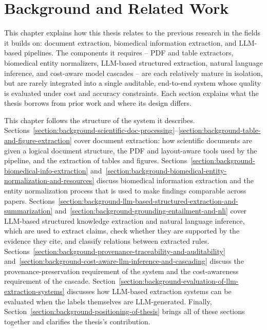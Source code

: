 
\chapter{Background and Related Work}\label{chapter:Related_Work}

This chapter explains how this thesis relates to the previous research in the fields it builds on: document extraction, biomedical information extraction, and LLM-based pipelines. The components it requires -- PDF and table extractors, biomedical entity normalizers, LLM-based structured extraction, natural language inference, and cost-aware model cascades -- are each relatively mature in isolation, but are rarely integrated into a single auditable, end-to-end system whose quality is evaluated under cost and accuracy constraints. Each section explains what the thesis borrows from prior work and where its design differs.

This chapter follows the structure of the system it describes. Sections~\ref{section:background-scientific-doc-processing}--\ref{section:background-table-and-figure-extraction} cover document extraction: how scientific documents are given a logical document structure, the PDF and layout-aware tools used by the pipeline, and the extraction of tables and figures. Sections~\ref{section:background-biomedical-info-extraction} and~\ref{section:background-biomedical-entity-normalization-and-resources} discuss biomedical information extraction and the entity normalization process that is used to make findings comparable across papers. Sections~\ref{section:background-llm-based-structured-extraction-and-summarization} and~\ref{section:background-grounding-entailment-and-nli} cover LLM-based structured knowledge extraction and natural language inference, which are used to extract claims, check whether they are supported by the evidence they cite, and classify relations between extracted rules. Sections~\ref{section:background-provenance-traceability-and-auditability} and~\ref{section:background-cost-aware-llm-inference-and-cascading} discuss the provenance-preservation requirement of the system and the cost-awareness requirement of the cascade. Section~\ref{section:background-evaluation-of-llm-extraction-systems} discusses how LLM-based extraction systems can be evaluated when the labels themselves are LLM-generated.
Finally, Section~\ref{section:background-positioning-of-thesis} brings all of these sections together and clarifies the thesis's contribution.

